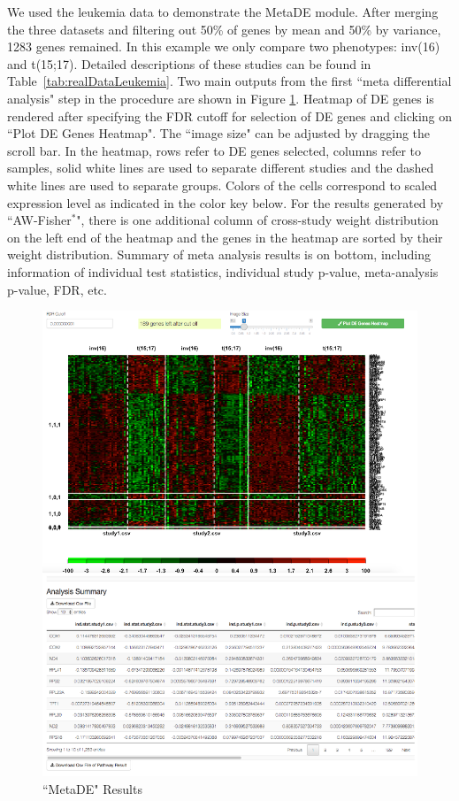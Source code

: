 We used the leukemia data to demonstrate the MetaDE module.
After merging the three datasets and filtering out 50\% of genes by mean and 50\% by variance, 1283 genes remained.
In this example we only compare two phenotypes: inv(16) and t(15;17).
Detailed descriptions of these studies can be found in Table~\ref{tab:realDataLeukemia}. 
Two main outputs from the first ``meta differential analysis" step in the procedure are shown in Figure \ref{fig:MetaDEresult1}. 
Heatmap of DE genes is rendered after specifying the FDR cutoff for selection of DE genes and clicking on ``Plot DE Genes Heatmap". 
The ``image size" can be adjusted by dragging the scroll bar. 
In the heatmap, rows refer to DE genes selected, columns refer to samples, solid white lines are used to separate different studies and the dashed white lines are used to separate groups. 
Colors of the cells correspond to scaled expression level as indicated in the color key below. 
For the results generated by ``AW-Fisher$^{\ast}$", there is one additional column of cross-study weight distribution on the left end of the heatmap and the genes in the heatmap are sorted by their weight distribution.
Summary of meta analysis results is on bottom, 
including information of individual test statistics, individual study p-value, meta-analysis p-value, FDR, etc. 


\begin{figure}[H]
\begin{center}
\includegraphics[scale=0.7]{./figure/metaDE/metaDEresult.pdf}
\caption{``MetaDE" Results}
\label{fig:MetaDEresult1}
\end{center}
\end{figure}

